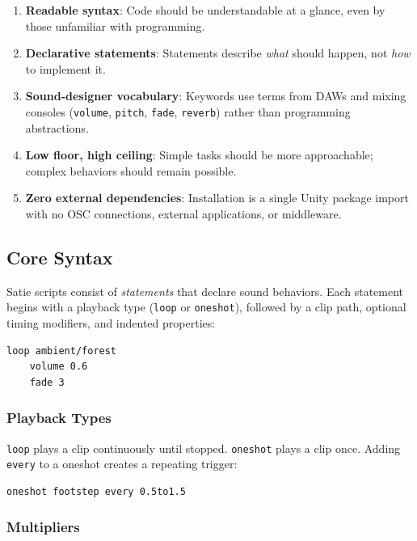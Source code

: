 \documentclass[sigconf,anonymous,review]{nimeart}
\begin{document}
\begin{enumerate}
    \item \textbf{Readable syntax}: Code should be understandable at a glance, even by those unfamiliar with programming.
    \item \textbf{Declarative statements}: Statements describe \textit{what} should happen, not \textit{how} to implement it.
    \item \textbf{Sound-designer vocabulary}: Keywords use terms from DAWs and mixing consoles (\texttt{volume}, \texttt{pitch}, \texttt{fade}, \texttt{reverb}) rather than programming abstractions.
    \item \textbf{Low floor, high ceiling}: Simple tasks should be more approachable; complex behaviors should remain possible.
    \item \textbf{Zero external dependencies}: Installation is a single Unity package import with no OSC connections, external applications, or middleware.
\end{enumerate}

\subsection{Core Syntax}

Satie scripts consist of \textit{statements} that declare sound behaviors. Each statement begins with a playback type (\texttt{loop} or \texttt{oneshot}), followed by a clip path, optional timing modifiers, and indented properties:

\begin{lstlisting}[language=satie]
loop ambient/forest
    volume 0.6
    fade 3
\end{lstlisting}

\subsubsection{Playback Types}

\texttt{loop} plays a clip continuously until stopped. \texttt{oneshot} plays a clip once. Adding \texttt{every} to a oneshot creates a repeating trigger:

\begin{lstlisting}[language=satie]
oneshot footstep every 0.5to1.5
\end{lstlisting}

\subsubsection{Multipliers}
\end{document}
